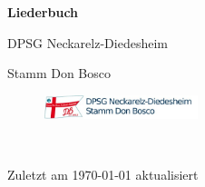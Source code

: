 \begin{titlepage}
\begin{center}
{\sffamily\huge\bfseries Liederbuch\par}
\vspace{1cm}
{\sffamily\Large DPSG Neckarelz-Diedesheim\par}
\vspace{0.5cm}
{\sffamily\Large Stamm Don Bosco\par}
\vspace{0.5cm}
\begin{figure}[h]
\centering
\includegraphics[width=0.4\textwidth]{img/header_dpsgnd.jpg}\par\
\end{figure}
{\sffamily\small Zuletzt am \today{} aktualisiert\par}
\end{center}
\end{titlepage}
